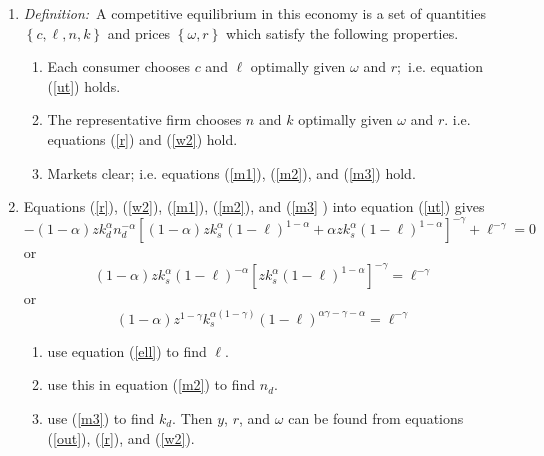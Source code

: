 \documentclass[12pt]{article}
\begin{document}
\begin{enumerate}
\begin{enumerate}
\item \textit{Definition:}\ A competitive equilibrium in this economy is a
set of quantities $\left\{ c,\ell ,n,k\right\} $ and prices $\left\{ \omega
,r\right\} $ which satisfy the following properties.

\begin{enumerate}
\item Each consumer chooses $c$ and $\ell $ optimally given $\omega $ and $%
r; $ i.e. equation (\ref{ut}) holds$.$

\item The representative firm chooses $n$ and $k$ optimally given $\omega $
and $r.$ i.e. equations (\ref{r}) and (\ref{w2}) hold.

\item Markets clear; i.e. equations (\ref{m1}), (\ref{m2}), and (\ref{m3})
hold.
\end{enumerate}

\item Equations (\ref{r}), (\ref{w2}), (\ref{m1}), (\ref{m2}), and (\ref{m3}%
) into equation (\ref{ut}) gives 
\begin{equation*}
-\left( 1-\alpha \right) zk_{d}^{\alpha }n_{d}^{-\alpha }\left[ \left(
1-\alpha \right) zk_{s}^{\alpha }\left( 1-\ell \right) ^{1-\alpha }+\alpha
zk_{s}^{\alpha }\left( 1-\ell \right) ^{1-\alpha }\right] ^{-\gamma }+\ell
^{-\gamma }=0
\end{equation*}%
or%
\begin{equation*}
\left( 1-\alpha \right) zk_{s}^{\alpha }\left( 1-\ell \right) ^{-\alpha } 
\left[ zk_{s}^{\alpha }\left( 1-\ell \right) ^{1-\alpha }\right] ^{-\gamma
}=\ell ^{-\gamma }
\end{equation*}%
or%
\begin{equation}
\left( 1-\alpha \right) z^{1-\gamma }k_{s}^{\alpha \left( 1-\gamma \right)
}\left( 1-\ell \right) ^{\alpha \gamma -\gamma -\alpha }=\ell ^{-\gamma }
\label{ell}
\end{equation}

\begin{enumerate}
\item use equation (\ref{ell}) to find $\ell .$

\item use this in equation (\ref{m2}) to find $n_{d}.$

\item use (\ref{m3}) to find $k_{d}.$ Then $y$, $r$, and $\omega $ can be
found from equations (\ref{out}), (\ref{r}), and (\ref{w2}).


\end{enumerate}
\end{enumerate}
\end{enumerate}
\end{document}
